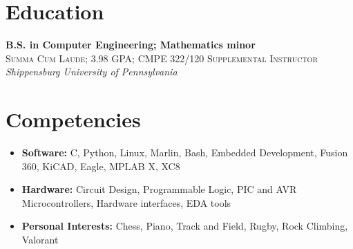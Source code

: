 \documentclass[
	12pt, %
]{FreemanCV}
\begin{document}
\vspace*{-5pt}
\section{Education}
	\textbf{B.S. in Computer Engineering; Mathematics minor}\\ %
	\small\textsc{Summa Cum Laude; 3.98 GPA; CMPE 322/120 Supplemental Instructor}\\ %
	\textit{Shippensburg University of Pennsylvania}\\ %

\vspace*{-5pt}
\section{Competencies}
\begin{itemize}[leftmargin=10pt]
	\itemsep-5pt
	\item \textbf{Software:} C, Python, Linux, Marlin, Bash, Embedded Development, Fusion 360, KiCAD, Eagle, MPLAB X, XC8
	\item \textbf{Hardware:} Circuit Design, Programmable Logic, PIC and AVR Microcontrollers, Hardware interfaces, EDA tools
	\item \textbf{Personal Interests:} Chess, Piano, Track and Field, Rugby, Rock Climbing, Valorant
\end{itemize}

\vfill
\vspace{1cm}
\end{document}
